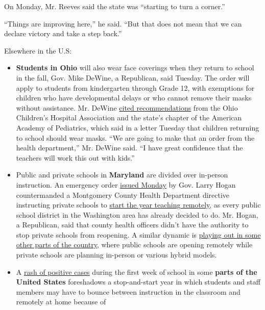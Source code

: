 On Monday, Mr. Reeves said the state was ``starting to turn a corner.''

``Things are improving here,'' he said. ``But that does not mean that we
can declare victory and take a step back.''

Elsewhere in the U.S:

\begin{itemize}
\item
  \textbf{Students in Ohio} will also wear face coverings when they
  return to school in the fall, Gov. Mike DeWine, a Republican, said
  Tuesday. The order will apply to students from kindergarten through
  Grade 12, with exemptions for children who have developmental delays
  or who cannot remove their masks without assistance. Mr. DeWine
  \href{https://twitter.com/GovMikeDeWine/status/1290715998102880259}{cited
  recommendations} from the Ohio Children's Hospital Association and the
  state's chapter of the American Academy of Pediatrics, which said in a
  letter Tuesday that children returning to school should wear masks.
  ``We are going to make that an order from the health department,'' Mr.
  DeWine said. ``I have great confidence that the teachers will work
  this out with kids.''
\item
  Public and private schools in \textbf{Maryland} are divided over
  in-person instruction. An emergency order
  \href{https://twitter.com/GovLarryHogan/status/1290330304830246912}{issued
  Monday} by Gov. Larry Hogan countermanded a Montgomery County Health
  Department directive instructing private schools to
  \href{https://www.montgomerycountymd.gov/OPI/Resources/Files/pdf/2020/NonPublicSchools_07-31-20.pdf}{start
  the year teaching remotely}, as every public school district in the
  Washington area has already decided to do. Mr. Hogan, a Republican,
  said that county health officers didn't have the authority to stop
  private schools from reopening. A similar dynamic is
  \href{https://www.nytimes3xbfgragh.onion/2020/07/16/upshot/coronavirus-school-reopening-private-public-gap.html}{playing
  out in some other parts of the country}, where public schools are
  opening remotely while private schools are planning in-person or
  various hybrid models.
\item
  A
  \href{https://www.nytimes3xbfgragh.onion/2020/08/03/us/school-closing-coronavirus.html}{rash
  of positive cases} during the first week of school in some
  \textbf{parts of the United States} foreshadows a stop-and-start year
  in which students and staff members may have to bounce between
  instruction in the classroom and remotely at home because of

\end{itemize}
